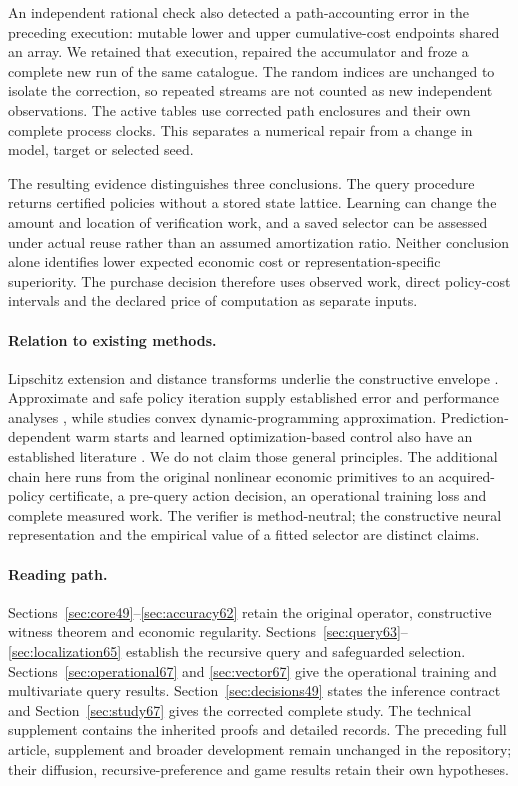 \documentclass[ecta,nameyear,draft]{econsocart}
\begin{document}
An independent rational check also detected a path-accounting error in the preceding execution: mutable lower and upper cumulative-cost endpoints shared an array. We retained that execution, repaired the accumulator and froze a complete new run of the same catalogue. The random indices are unchanged to isolate the correction, so repeated streams are not counted as new independent observations. The active tables use corrected path enclosures and their own complete process clocks. This separates a numerical repair from a change in model, target or selected seed.

The resulting evidence distinguishes three conclusions. The query procedure returns certified policies without a stored state lattice. Learning can change the amount and location of verification work, and a saved selector can be assessed under actual reuse rather than an assumed amortization ratio. Neither conclusion alone identifies lower expected economic cost or representation-specific superiority. The purchase decision therefore uses observed work, direct policy-cost intervals and the declared price of computation as separate inputs.

\paragraph{Relation to existing methods.}
Lipschitz extension and distance transforms underlie the constructive envelope \citep{mcshane1934,felzenszwalb2012}. Approximate and safe policy iteration supply established error and performance analyses \citep{munos2003,pirotta2013,scherrer2015}, while \citet{yang2020convex} studies convex dynamic-programming approximation. Prediction-dependent warm starts and learned optimization-based control also have an established literature \citep{sakaue2023warm,sambharya2023,agrawal2020control}. We do not claim those general principles. The additional chain here runs from the original nonlinear economic primitives to an acquired-policy certificate, a pre-query action decision, an operational training loss and complete measured work. The verifier is method-neutral; the constructive neural representation and the empirical value of a fitted selector are distinct claims.

\paragraph{Reading path.}
Sections~\ref{sec:core49}--\ref{sec:accuracy62} retain the original operator, constructive witness theorem and economic regularity. Sections~\ref{sec:query63}--\ref{sec:localization65} establish the recursive query and safeguarded selection. Sections~\ref{sec:operational67} and \ref{sec:vector67} give the operational training and multivariate query results. Section~\ref{sec:decisions49} states the inference contract and Section~\ref{sec:study67} gives the corrected complete study. The technical supplement contains the inherited proofs and detailed records. The preceding full article, supplement and broader development remain unchanged in the repository; their diffusion, recursive-preference and game results retain their own hypotheses.
\end{document}
